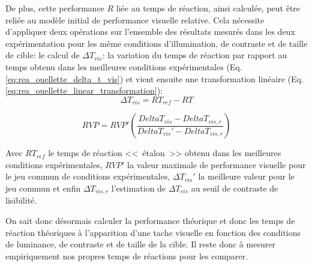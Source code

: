 	\par De plus, cette performance $R$ liée au temps de réaction, ainsi calculée, peut être reliée au modèle initial de performance visuelle relative. Cela nécessite d'appliquer deux opérations sur l'ensemble des résultats mesurés dans les deux expérimentation pour les même conditions d'illumination, de contraste et de taille de cible: le calcul de $\Delta T_{vis}$: la variation du temps de réaction par rapport au temps obtenu dans les meilleures conditions expérimentales (Eq. \ref{eq:rea_ouellette_delta_t_vis}) et vient ensuite une transformation linéaire (Eq. \ref{eq:rea_ouellette_linear_transformation}):
	\begin{equation}
		\Delta T_{vis} = RT_{ref} - RT
		\label{eq:rea_ouellette_delta_t_vis}
	\end{equation}
	
	\begin{equation}
		RVP = RVP' \left(\frac{Delta T_{vis} - Delta T_{vis,r}}{Delta T_{vis}' - Delta T_{vis,r}}\right)
		\label{eq:rea_ouellette_linear_transformation}
	\end{equation}
	
	\par Avec $RT_{ref}$ le temps de réaction <<~étalon~>> obtenu dans les meilleures conditions expérimentales, $RVP'$ la valeur maximale de performance visuelle pour le jeu commun de conditions expérimentales, $\Delta T_{vis}'$ la meilleure valeur pour le jeu commun et enfin $\Delta T_{vis,r}$ l'estimation de $\Delta T_{vis}$ au seuil de contraste de lisibilité.
	
	\par On sait donc désormais calculer la performance théorique et donc les temps de réaction théoriques à l'apparition d'une tache visuelle en fonction des conditions de luminance, de contraste et de taille de la cible. Il reste donc à mesurer empiriquement nos propres temps de réactions pour les comparer.
